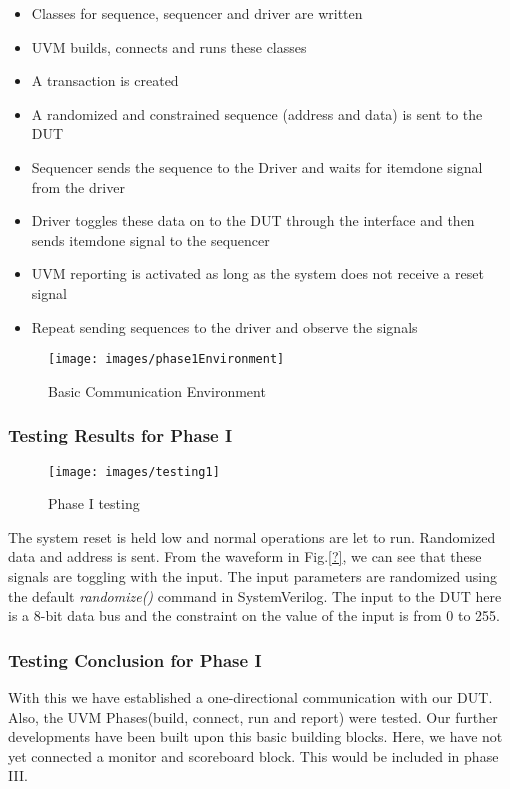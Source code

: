 \documentclass[a4paper,11pt]{article}
\begin{document}
\begin{itemize}[noitemsep]
\item Classes for sequence, sequencer and driver are written
\item UVM builds, connects and runs these classes
\item A transaction is created
\item A randomized and constrained sequence (address and data) is sent to the DUT
\item Sequencer sends the sequence to the Driver and waits for item\textunderscore done signal from the driver
\item Driver toggles these data on to the DUT through the interface and then sends item\textunderscore done signal to the sequencer
\item UVM reporting is activated as long as the system does not receive a reset signal
\item Repeat sending sequences to the driver and observe the signals
\end{itemize}

\begin{figure}[ht]
\centering
\texttt{[image: images/phase1Environment]}
\caption{Basic Communication Environment}
\end{figure}

\subsubsection{Testing Results for Phase I}

\begin{figure}[ht]
\centering
\texttt{[image: images/testing1]}
\caption{Phase I testing}
\end{figure}

The system reset is held low and normal operations are let to run. Randomized data and address is sent. From the waveform in Fig.\ref{?}, we can see that these signals are toggling with the input. The input parameters are randomized using the default \textit{randomize()} command in SystemVerilog. The input to the DUT here is a 8-bit data bus and the constraint on the value of the input is from 0 to 255. 

\subsubsection{Testing Conclusion for Phase I}
With this we have established a one-directional communication with our DUT. Also, the UVM Phases(build, connect, run and report) were tested. Our further developments have been built upon this basic building blocks. Here, we have not yet connected a monitor and scoreboard block. This would be included in phase III.
\ \\
\FloatBarrier
\end{document}
